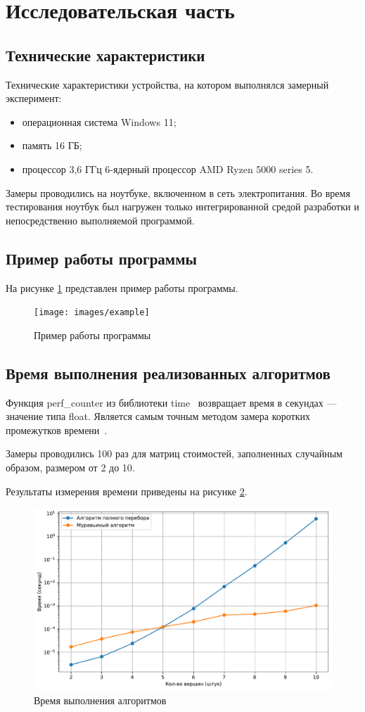 \section{Исследовательская часть}

\subsection{Технические характеристики}

Технические характеристики устройства, на котором выполнялся замерный эксперимент:
\begin{itemize}[label*=---]
	\item операционная система Windows 11;
	\item память 16 ГБ;
	\item процессор 3,6 ГГц 6-ядерный процессор AMD Ryzen 5000 series 5.
\end{itemize}

Замеры проводились на ноутбуке, включенном в сеть электропитания. 
Во время тестирования ноутбук был нагружен только интегрированной средой разработки и непосредственно выполняемой программой.

\subsection{Пример работы программы}

На рисунке \ref{fig:example} представлен пример работы программы. 

\begin{figure}
	\centering
	\texttt{[image: images/example]}
	\caption{Пример работы программы}
	\label{fig:example}
\end{figure}

\newpage

\subsection{Время выполнения реализованных алгоритмов}
Функция perf\_counter из библиотеки time~\cite{time} возвращает время в секундах --- значение типа float.
Является самым точным методом замера коротких промежутков времени~\cite{perf}.

Замеры проводились 100 раз для матриц стоимостей, заполненных случайным образом, размером от 2 до 10.

Результаты измерения времени приведены на рисунке \ref{fig:results}.
\begin{figure}
	\centering
	\includegraphics[width=0.7\linewidth]{../src/lab_06/results_logscale}
	\caption{Время выполнения алгоритмов}
	\label{fig:results}
\end{figure}


